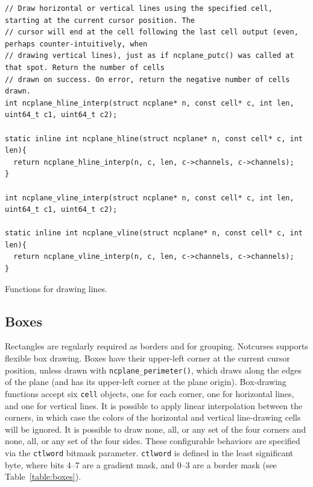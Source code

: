 \documentclass[letterpaper,10pt]{article}
\begin{document}
\begin{listing}[!htb]
\begin{verbatim}
// Draw horizontal or vertical lines using the specified cell, starting at the current cursor position. The
// cursor will end at the cell following the last cell output (even, perhaps counter-intuitively, when
// drawing vertical lines), just as if ncplane_putc() was called at that spot. Return the number of cells
// drawn on success. On error, return the negative number of cells drawn.
int ncplane_hline_interp(struct ncplane* n, const cell* c, int len, uint64_t c1, uint64_t c2);

static inline int ncplane_hline(struct ncplane* n, const cell* c, int len){
  return ncplane_hline_interp(n, c, len, c->channels, c->channels);
}

int ncplane_vline_interp(struct ncplane* n, const cell* c, int len, uint64_t c1, uint64_t c2);

static inline int ncplane_vline(struct ncplane* n, const cell* c, int len){
  return ncplane_vline_interp(n, c, len, c->channels, c->channels);
}
\end{verbatim}
\caption{Functions for drawing lines.}
\label{list:lines}
\end{listing}

\subsection{Boxes}
\label{sec:boxes}
Rectangles are regularly required as borders and for grouping. Notcurses supports
flexible box drawing. Boxes have their upper-left corner at the current cursor
position, unless drawn with \texttt{ncplane\_perimeter()}, which draws along the
edges of the plane (and has its upper-left corner at the plane origin). Box-drawing
functions accept six \texttt{cell} objects, one for each corner, one for horizontal
lines, and one for vertical lines. It is possible to apply linear interpolation
between the corners, in which case the colors of the horizontal and vertical
line-drawing cells will be ignored. It is possible to draw none, all, or any set
of the four corners and none, all, or any set of the four sides. These configurable
behaviors are specified via the \texttt{ctlword} bitmask parameter.
\texttt{ctlword} is defined in the least significant byte, where bits 4--7 are
a gradient mask, and 0--3 are a border mask (see Table~\ref{table:boxes}).
\end{document}
